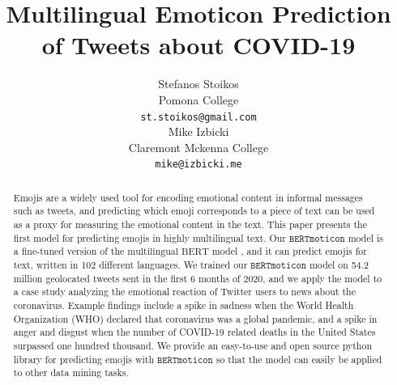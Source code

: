 \documentclass[11pt]{article}
\title{Multilingual Emoticon Prediction of Tweets about COVID-19 \emoji{mask_photo.png} }
\author{Stefanos Stoikos \\
  Pomona College\\

  {\tt st.stoikos@gmail.com} \\\And
  Mike Izbicki \\
  Claremont Mckenna College\\
  {\tt mike@izbicki.me} \\}
\date{}
\newcommand{\bertmoji}{\texttt{BERTmoticon}}
\newcommand{\bert}{\text{multilingual BERT}}
\begin{document}
\maketitle
\begin{abstract}
    Emojis are a widely used tool for encoding emotional content in informal messages such as tweets,
    and predicting which emoji corresponds to a piece of text can be used as a proxy for measuring the emotional content in the text.
    This paper presents the first model for predicting emojis in highly multilingual text.
    Our $\bertmoji$ model is a fine-tuned version of the $\bert$ model \citep{devlin2018bert},
    and it can predict emojis for text, written in 102 different languages.
    We trained our $\bertmoji$ model on 54.2 million geolocated tweets sent in the first 6 months of 2020,
    and we apply the model to a case study analyzing the emotional reaction of Twitter users to news about the coronavirus.
    Example findings include a spike in sadness when the World Health Organization (WHO) declared that coronavirus was a global pandemic,
    and a spike in anger and disgust when the number of COVID-19 related deaths in the United States surpassed one hundred thousand.
    We provide an easy-to-use and open source python library for predicting emojis with $\bertmoji$ so that the model can easily be applied to other data mining tasks.
\end{abstract}

%
% 
\end{document}

